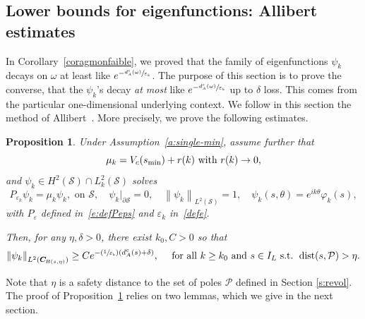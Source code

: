 \documentclass[JEP,XML,SOM,Unicode]{cedram}
\newcommand{\Psfrac}[2]{(\sfrac{#1}{#2})}
\newtheorem{proposition}[lemma]{Proposition}
\theoremstyle{definition}
\renewcommand{\P}{\ensuremath{\mathcal P}}
\newcommand{\calS}{\ensuremath{\mathcal S}}
\DeclareMathOperator{\dist}{dist}
\newcommand\nor[2]{\left\|#1\right\|_{#2}}
\newcommand{\ce}{c}
\let\d\partial
\let\e\varepsilon
\let\eps\varepsilon
\newcommand\CO[1]{\boldsymbol{C}_{\!#1}}
\begin{document}
\subsection{Lower bounds for eigenfunctions: Allibert estimates}
\label{sectlower}
In Corollary~\ref{coragmonfaible}, we proved that the family of eigenfunctions $\psi_k$ decays on $\omega$ at least like $e^{-\sfrac{d_A^{\ce}(\omega)}{\eps_k}}$.
The purpose of this section is to prove the converse, \ie that the $\psi_k$'s decay {\em at most} like $e^{-\sfrac{d_A^{\ce}(\omega)}{\eps_k}}$ up to $\delta$ loss.
This comes from the particular one-dimensional underlying context.
We follow in this section the method of Allibert~\cite{Allibert:98}.
More precisely, we prove the following estimates.
\begin{proposition}
\label{propinfdA}
Under Assumption~\ref{a:single-min}, assume further that
\begin{equation}
\label{rappelmuinf}\mu_k = V_\ce(s_{\min}) +r(k)\textnormal{ with }r(k)\to 0,
\end{equation}
and $\psi_k \in H^2 (\mathcal{S})\cap L^2_k(\calS)$ solves
\[
P_{\e_k}\psi_k=\mu_k \psi_k, \text{ on } \calS, \quad \psi_k|_{\d\calS} = 0,\quad \nor{\psi_k}{L^2(\calS)}=1, \quad \psi_k(s, \theta) = e^{ik \theta}\varphi_k(s),
\]
with $P_\eps$ defined in~\eqref{e:defPeps} and $\e_k$ in~\eqref{defe}.

Then, for any $\eta,\delta>0$, there exist $k_0,C>0$ so that
\[
\nor{\psi_k}{L^2(\CO{B(s,\eta)})}\geq C e^{-\Psfrac{1}{\e_k}(d_A^{\ce}(s)+\delta)}, \quad \text{ for all } k\geq k_0\text{ and }s \in I_L \text{ s.t. }\dist(s,\mathcal{P} )>\eta.
\]
\end{proposition}
Note that $\eta$ is a safety distance to the set of poles $\P$ defined in Section \ref{s:revol}.
The proof of Proposition~\ref{propinfdA} relies on two lemmas, which we give in the next section.
\end{document}
